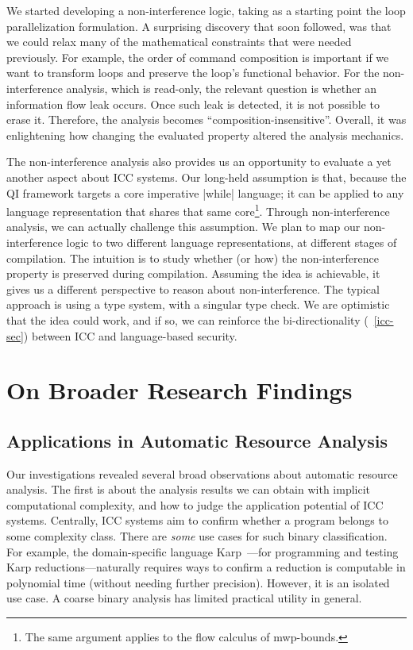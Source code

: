 We started developing a non-interference logic, taking as a starting point
the loop parallelization formulation.
A surprising discovery that soon followed, was that we could relax many of the mathematical constraints that were needed previously.
For example, the order of command composition is important if we want to
transform loops and preserve the loop's functional behavior.
For the non-interference analysis, which is read-only, the relevant question is whether an information flow leak occurs.
Once such leak is detected, it is not possible to erase it.
Therefore, the analysis becomes \enquote{composition-insensitive}.
Overall, it was enlightening how changing the evaluated property altered the analysis mechanics.

The non-interference analysis also provides us an opportunity to evaluate a yet another aspect about ICC systems.
Our long-held assumption is that, because the QI framework targets a core imperative \pr|while| language;
it can be applied to any language representation that shares that same core\footnote{The same argument applies to the flow calculus of mwp-bounds.}.
Through non-interference analysis, we can actually challenge this assumption.
We plan to map our non-interference logic to two different language representations, at different stages of compilation.
The intuition is to study whether (or how) the non-interference property is preserved during compilation.
Assuming the idea is achievable, it gives us a different perspective to reason about non-interference.
The typical approach is using a type system, with a singular type check.
We are optimistic that the idea could work, and if so,
we can reinforce the bi-directionality (\cf~\autoref{icc-sec}) between ICC and language-based security.

\section{On Broader Research Findings}
\label{sec:broader-findings}

\subsection{Applications in Automatic Resource Analysis}
\label{subsec:res-resource-analysis}

Our investigations revealed several broad observations about automatic resource analysis.
The first is about the analysis results we can obtain with implicit computational complexity, and how to judge the application potential of ICC systems.
Centrally, ICC systems aim to confirm whether a program belongs to some complexity class.
There are \emph{some} use cases for such binary classification.
For example, the domain-specific language Karp~\cite{zhang2022}---for programming and testing Karp reductions---naturally requires ways to confirm a reduction is computable in polynomial time (without needing further precision).
However, it is an isolated use case. 
A coarse binary analysis has limited practical utility in general.

